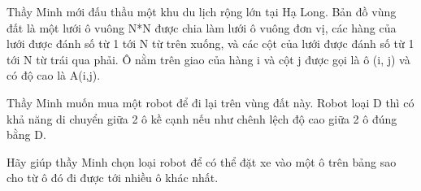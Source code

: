 Thầy Minh mới đấu thầu một khu du lịch rộng lớn tại Hạ Long. Bản đồ vùng đất là một lưới ô vuông N*N được chia làm lưới ô vuông đơn vị, các hàng của lưới được đánh số từ 1 tới N từ trên xuống, và các cột của lưới được đánh số từ 1 tới N từ trái qua phải. Ô nằm trên giao của hàng i và cột j được gọi là ô (i, j) và có độ cao là A(i,j).  

   Thầy Minh muốn mua một robot để đi lại trên vùng đất này. Robot loại D thì có khả năng di chuyển giữa 2 ô kề cạnh nếu như chênh lệch độ cao giữa 2 ô đúng bằng D.  

   Hãy giúp thầy Minh chọn loại robot để có thể đặt xe vào một ô trên bảng sao cho từ ô đó đi được tới nhiều ô khác nhất.